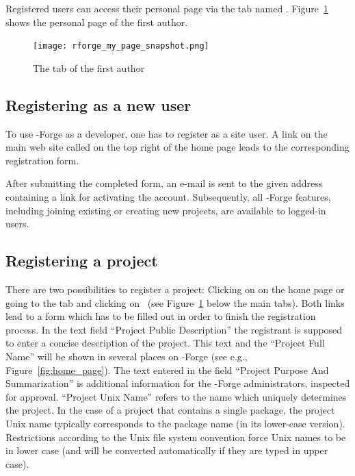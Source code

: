 Registered users can access their personal
page via the tab named . Figure~\ref{fig:my_page} shows
the personal page of the first author.

\begin{figure}[th]
\centering
\texttt{[image: rforge\_my\_page\_snapshot.png]}
\caption{The  tab of the first author}
\label{fig:my_page}
\end{figure}

\subsection{Registering as a new user}

To use \R{}-Forge as a developer, one has
to register as a site user. A link on the main web site called
 on the top right of the home page leads to the
corresponding registration form.

After submitting the completed form, an e-mail is sent to the given
address containing a link for activating the account. Subsequently,
all \R{}-Forge features, including joining existing or creating
new projects, are available to logged-in users.

\subsection{Registering a project}

There are two possibilities to register a project: Clicking on
 on the home page or going to the
 tab and clicking on ~(see
Figure~\ref{fig:my_page} below the main tabs). Both links lead to a
form which has to be filled out in order to finish the registration
process. In the text field ``Project Public Description'' the
registrant is supposed to enter a concise description of the
project. This text and the ``Project Full Name'' will be shown in
several places on \R{}-Forge (see e.g., Figure~\ref{fig:home_page}). The text
entered in the field ``Project Purpose And Summarization'' is
additional information for the \R{}-Forge administrators, inspected
for approval. ``Project Unix
Name'' refers to the name which
uniquely determines the project. In the case of a project that contains a
single \R{} package, the project Unix name typically corresponds to
the package name (in its lower-case version). Restrictions according to
the Unix file system convention force Unix names to be in lower case
(and will be converted automatically if they are typed in upper case).

